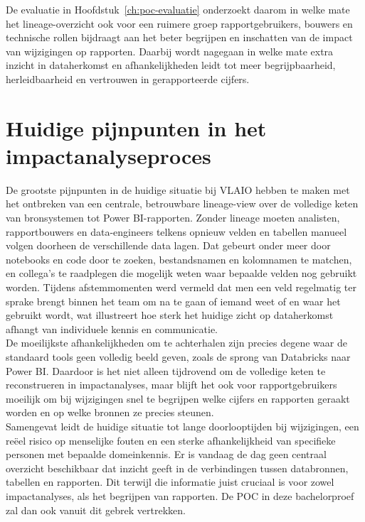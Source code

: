 De evaluatie in Hoofdstuk~\ref{ch:poc-evaluatie} onderzoekt daarom in welke mate het lineage-overzicht ook voor een ruimere groep rapportgebruikers, bouwers en technische rollen bijdraagt aan het beter begrijpen en inschatten van de impact van wijzigingen op rapporten. Daarbij wordt nagegaan in welke mate extra inzicht in dataherkomst en afhankelijkheden leidt tot meer begrijpbaarheid, herleidbaarheid en vertrouwen in gerapporteerde cijfers.

\section{Huidige pijnpunten in het impactanalyseproces}

De grootste pijnpunten in de huidige situatie bij VLAIO hebben te maken met het ontbreken van een centrale, betrouwbare lineage-view over de volledige keten van bronsystemen tot Power BI-rapporten. Zonder lineage moeten analisten, rapportbouwers en data-engineers telkens opnieuw velden en tabellen manueel volgen doorheen de verschillende data lagen. Dat gebeurt onder meer door notebooks en code door te zoeken, bestandsnamen en kolomnamen te matchen, en collega’s te raadplegen die mogelijk weten waar bepaalde velden nog gebruikt worden. Tijdens afstemmomenten werd vermeld dat men een veld regelmatig ter sprake brengt binnen het team om na te gaan of iemand weet of en waar het gebruikt wordt, wat illustreert hoe sterk het huidige zicht op dataherkomst afhangt van individuele kennis en communicatie.\\

De moeilijkste afhankelijkheden om te achterhalen zijn precies degene waar de standaard tools geen volledig beeld geven, zoals de sprong van Databricks naar Power BI. Daardoor is het niet alleen tijdrovend om de volledige keten te reconstrueren in impactanalyses, maar blijft het ook voor rapportgebruikers moeilijk om bij wijzigingen snel te begrijpen welke cijfers en rapporten geraakt worden en op welke bronnen ze precies steunen.\\

Samengevat leidt de huidige situatie tot lange doorlooptijden bij wijzigingen, een reëel risico op menselijke fouten en een sterke afhanke\-lijk\-heid van specifieke personen met bepaalde domeinkennis. Er is vandaag de dag geen centraal overzicht beschikbaar dat inzicht geeft in de verbindingen tussen databronnen, tabellen en rapporten. Dit terwijl die informatie juist cruciaal is voor zowel impactanalyses, als het begrijpen van rapporten. De POC in deze bachelorproef zal dan ook vanuit dit gebrek vertrekken.

